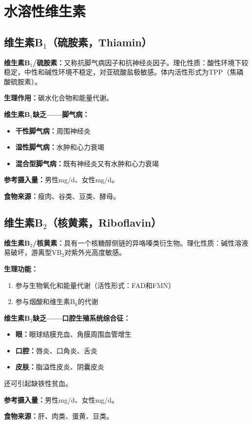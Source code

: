 \section{水溶性维生素}

\subsection{维生素B$_1$（硫胺素，Thiamin）}

\begin{keybox}
\textbf{维生素B$_1$/硫胺素：}又称抗脚气病因子和抗神经炎因子。理化性质：酸性环境下较稳定，中性和碱性环境不稳定，对亚硫酸盐极敏感。体内活性形式为TPP（焦磷酸硫胺素）。

\textbf{生理作用：}碳水化合物和能量代谢。
\end{keybox}

\begin{keybox}
\textbf{维生素B$_1$缺乏——脚气病：}
\begin{itemize}[leftmargin=*]
    \item \textbf{干性脚气病：}周围神经炎
    \item \textbf{湿性脚气病：}水肿和心力衰竭
    \item \textbf{混合型脚气病：}既有神经炎又有水肿和心力衰竭
\end{itemize}

\textbf{参考摄入量：}男性mg/d、女性mg/d。

\textbf{食物来源：}瘦肉、谷类、豆类、酵母。
\end{keybox}

\subsection{维生素B$_2$（核黄素，Riboflavin）}

\begin{keybox}
\textbf{维生素B$_2$/核黄素：}具有一个核糖醇侧链的异咯嗪类衍生物。理化性质：碱性溶液易破坏，游离型VB$_2$对紫外光高度敏感。

\textbf{生理功能：}
\begin{enumerate}[leftmargin=*]
    \item 参与生物氧化和能量代谢（活性形式：FAD和FMN）
    \item 参与烟酸和维生素B$_6$的代谢
\end{enumerate}
\end{keybox}

\begin{keybox}
\textbf{维生素B$_2$缺乏——口腔生殖系统综合征：}
\begin{itemize}[leftmargin=*]
    \item \textbf{眼：}眼球结膜充血、角膜周围血管增生
    \item \textbf{口腔：}唇炎、口角炎、舌炎
    \item \textbf{皮肤：}脂溢性皮炎、阴囊皮炎
\end{itemize}
还可引起缺铁性贫血。

\textbf{参考摄入量：}男性mg/d、女性mg/d。

\textbf{食物来源：}肝、肉类、蛋黄、豆类。
\end{keybox}

